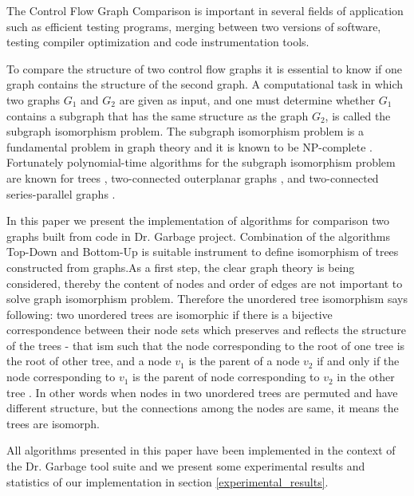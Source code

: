 The Control Flow Graph Comparison is important in several fields of application such as efficient testing programs, merging between two versions of software, testing compiler optimization and code instrumentation tools.

To compare the structure of two control flow graphs it is essential to know if one graph contains the structure of the second graph. A computational task in which two graphs $G_1$ and $G_2$ are given as input, and one must determine whether $G_1$ contains a subgraph that has the same structure as the graph $G_2$, is called  the subgraph isomorphism problem. 
The subgraph isomorphism problem is a fundamental problem in graph theory and it is known 
to be NP-complete \cite{ulman_isomorphism}. 
Fortunately polynomial-time algorithms for the subgraph isomorphism problem
are known for trees \cite{matula_alg_subtree_isomorphism}, 
two-connected outerplanar graphs \cite{lingas_isomorphism_outerplanar_graphs}, 
and two-connected series-parallel graphs \cite{lingas_isomorphism_2connected_graphs}.

In this paper we present the implementation of algorithms for comparison two graphs built from code in Dr. Garbage project. Combination of the algorithms Top-Down and Bottom-Up is suitable instrument to define isomorphism of trees constructed from graphs.As a first step, the clear graph theory is being considered, thereby the content of nodes and order of edges are not important to solve graph isomorphism problem. Therefore the unordered tree isomorphism says following: two unordered trees are isomorphic if there is a bijective correspondence between their node sets which preserves and reflects the structure of the trees - that ism such that the node corresponding to the root of one tree is the root of other tree, and a node $v_1$ is the parent of a node $v_2$ if and only if the node corresponding to $v_1$ is the parent of node corresponding to $v_2$ in the other tree \cite{Valiente_algorithms_tree}. In other words when nodes in two unordered trees are permuted and have different structure, but the connections among the nodes are same, it means the trees are isomorph.

All  algorithms presented in this paper have been implemented 
in the context of the Dr. Garbage tool suite
\cite{tools_drgarbage} and we present some experimental results and statistics of our implementation in section \ref{experimental_results}.
